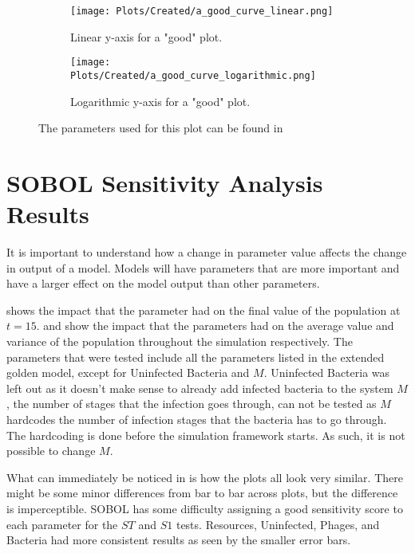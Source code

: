 \begin{figure}[h!]
    \centering
    \begin{subfigure}{1\linewidth}
        \centering
        \captionsetup{width=1\linewidth}
        \texttt{[image: Plots/Created/a\_good\_curve\_linear.png]}
        \caption{
            Linear y-axis for a "good" plot. 
        }
        \label{fig:created:a_good_curve_linear}
    \end{subfigure}
    \hfill
    \begin{subfigure}{1\linewidth}
        \centering
        \captionsetup{width=1\linewidth}
        \texttt{[image: Plots/Created/a\_good\_curve\_logarithmic.png]}
        \caption{
            Logarithmic y-axis for a "good" plot. 
        }
        \label{fig:created:a_good_curve_logarithmic}
    \end{subfigure}
    \caption{The parameters used for this plot can be found in }
    \label{fig:created:a_good_curve}
\end{figure}



\section{SOBOL Sensitivity Analysis Results}
\label{sec:SOBOL_sensitivity_analysis_results}
It is important to understand how a change in parameter value affects the change in output of a model. 
Models will have parameters that are more important and have a larger effect on the model output than other parameters. 

 shows the impact that the parameter had on the final value of the population at $t=15$. 
 and  show the impact that the parameters had on the average value and variance of the population throughout the simulation respectively. 
The parameters that were tested include all the parameters listed in the extended golden model, except for Uninfected Bacteria and $M$. 
Uninfected Bacteria was left out as it doesn't make sense to already add infected bacteria to the system
$M$, the number of stages that the infection goes through, can not be tested as $M$ hardcodes the number of infection stages that the bacteria has to go through. 
The hardcoding is done before the simulation framework starts. 
As such, it is not possible to change $M$. 

What can immediately be noticed in  is how the plots all look very similar. 
There might be some minor differences from bar to bar across plots, but the difference is imperceptible. 
SOBOL has some difficulty assigning a good sensitivity score to each parameter for the $ST$ and $S1$ tests. 
Resources, Uninfected, Phages, and Bacteria had more consistent results as seen by the smaller error bars. 

